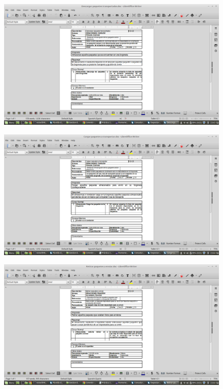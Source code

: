 \begin{figure}[H]
	\centering
	\includegraphics[width=16cm]{22}
\end{figure}
\begin{figure}[H]
	\centering
	\includegraphics[width=16cm]{23}
\end{figure}
\begin{figure}[H]
	\centering
	\includegraphics[width=16cm]{24}
\end{figure}
